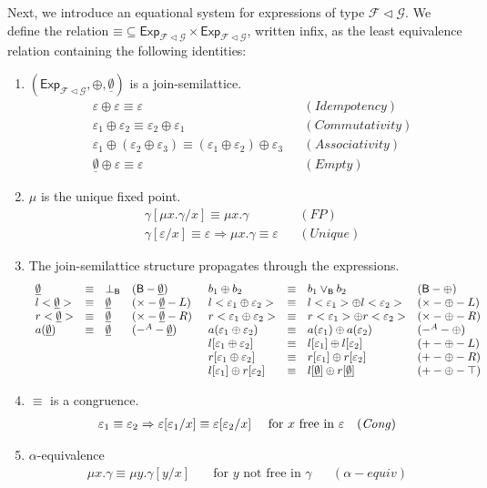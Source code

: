 \documentclass{LMCS}
\newcommand\E\varepsilon
\newcommand\Exp{\mathsf{Exp}}
\newcommand\B{\mathsf{B}}
\newcommand\G{\mathcal{G}}
\newcommand\F{\mathcal{F}}
\newcommand\emp{\underline\emptyset}
\theoremstyle{definition}
\theoremstyle{plain}
\theoremstyle{plain}
\theoremstyle{plain}
\theoremstyle{plain}
\theoremstyle{definition}
\theoremstyle{definition}
\begin{document}
Next, we introduce an equational system  for expressions
of type $\F \lhd \G$. We define the relation
$\mathord{\equiv}\subseteq \Exp_{\F\lhd \G}\times \Exp_{\F\lhd \G}$, written
infix, as the least equivalence relation containing the
following identities:
\begin{enumerate}
\item $(\Exp_{\F \lhd \G}, \oplus, \emp)$ is a join-semilattice.
\begin{align*}
   &\E \oplus \E  \equiv \E && \mathit{(Idempotency)}\\
 &\E_1 \oplus \E_2  \equiv \E_2 \oplus \E_1 &&\mathit{(Commutativity)} \\
  &\E_1 \oplus (\E_2 \oplus \E_3)   \equiv (\E_1 \oplus
\E_2) \oplus \E_3 && \mathit{(Associativity)} \\
 &\emp \oplus \E \equiv \E &&\mathit{(Empty)}     
\end{align*}
\item $\mu$ is the unique fixed point.
\begin{align*}
&\gamma[\mu x.\gamma/x] \equiv \mu x . \gamma && \mathit{(FP)}  \\
&{\gamma[\E/x]  \equiv  \E \Rightarrow \mu
x.\gamma \equiv \E} &&\mathit{(Unique)}
\end{align*}
\item The join-semilattice structure propagates through the
expressions.
\[
\begin{array}{lcll@{\hspace{.5cm}}lcll}
\emp &\equiv& \bot_\B & (\B - \emp) &  b_1 \oplus b_2 &\equiv& b_1 \vee_\B b_2
&(\B - \oplus)  \\
  l<\emp> &\equiv& \emp & (\times - \emp - L) &   l<\E_1 \oplus \E_2>
&\equiv& l<\E_1> \oplus l<\E_2> &(\times - \oplus - L)\\
 r<\emp> &\equiv& \emp &(\times - \emp - R)  &
r<\E_1 \oplus \E_2> &\equiv& r<\E_1> \oplus r<\E_2> &(\times - \oplus - R) 
\\
  a(\emp) &\equiv& \emp &(-^A - \emp)  &
  a(\E_1 \oplus \E_2) &\equiv& a(\E_1) \oplus a(\E_2)&(-^A - \oplus)\\
&& &&  l[\E_1 \oplus \E_2] &\equiv& l[\E_1] \oplus l[\E_2] &(+ - \oplus - L) 
\\ &&&&     r[\E_1 \oplus \E_2] &\equiv& r[\E_1] \oplus
r[\E_2]&(+ - \oplus - R) \\
& &&&  l[\E_1] \oplus r[\E_2] &\equiv& l[\emp] \oplus r[\emp]
&{(+ - \oplus - \top)} 
\end{array}
\]
\item $\equiv$ is a congruence.
\begin{align*}
\E_1\equiv \E_2 \Rightarrow \E[\E_1/x]\equiv \E[\E_2/x]& \text{\ \ \ \
for $x$ free in $\E$}&(\mathit{Cong})
\end{align*}

\item $\alpha$-equivalence
\begin{align*}
\mu x.\gamma \equiv \mu y. \gamma[y/x] &\ \ \   \text{ for 
$y$  not free in $\gamma$}&& \mathit {(\alpha-\mathit{equiv})} 
\end{align*}
\end{enumerate}
\end{document}
